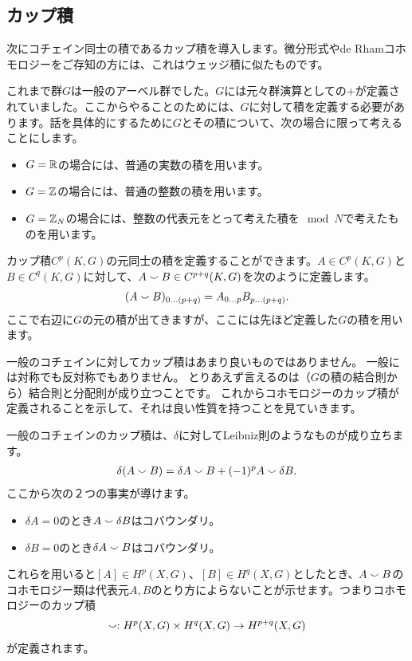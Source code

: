 \documentclass[generalized_symmetry.tex]{subfiles}
\begin{document}
\subsection{カップ積}

次にコチェイン同士の積であるカップ積を導入します。微分形式やde Rhamコホモロジーをご存知の方には、これはウェッジ積に似たものです。

これまで群$G$は一般のアーベル群でした。$G$には元々群演算としての$+$が定義されていました。ここからやることのためには、$G$に対して積を定義する必要があります。話を具体的にするために$G$とその積について、次の場合に限って考えることにします。
\begin{itemize}
    \item $G=\mathbb{R}$の場合には、普通の実数の積を用います。
    \item $G=\mathbb{Z}$の場合には、普通の整数の積を用います。
    \item $G=\mathbb{Z}_N$の場合には、整数の代表元をとって考えた積を$\mod N$で考えたものを用います。
\end{itemize}

カップ積$C^p(K,G)$の元同士の積を定義することができます。$A \in C^p(K,G)$と$B \in C^q(K,G)$に対して、$A \smallsmile B \in C^{p+q}(K,G)$を次のように定義します。
\begin{align}
    (A \smallsmile B)_{0\dots (p+q)} = A_{0\dots p} B_{p \dots (p+q)}.
\end{align}
ここで右辺に$G$の元の積が出てきますが、ここには先ほど定義した$G$の積を用います。

一般のコチェインに対してカップ積はあまり良いものではありません。
一般には対称でも反対称でもありません。
とりあえず言えるのは（$G$の積の結合則から）結合則と分配則が成り立つことです。
これからコホモロジーのカップ積が定義されることを示して、それは良い性質を持つことを見ていきます。

一般のコチェインのカップ積は、$\delta$に対してLeibniz則のようなものが成り立ちます。
\begin{align}
    \delta (A \smallsmile B) = \delta A \smallsmile B + (-1)^{p} A \smallsmile \delta B.
    \label{coboundarycup}
\end{align}
ここから次の２つの事実が導けます。
\begin{itemize}
    \item $\delta A=0$のとき$A\smallsmile \delta B$はコバウンダリ。
    \item $\delta B=0$のとき$\delta A \smallsmile B$はコバウンダリ。
\end{itemize}
これらを用いると$[A] \in H^p(X,G)$、$[B] \in H^{q}(X,G)$としたとき、$A \smallsmile B$のコホモロジー類は代表元$A,B$のとり方によらないことが示せます。つまりコホモロジーのカップ積
\begin{align}
    \smallsmile : H^{p}(X,G)\times H^{q}(X,G) \to H^{p+q}(X,G)
\end{align}
が定義されます。
\end{document}
